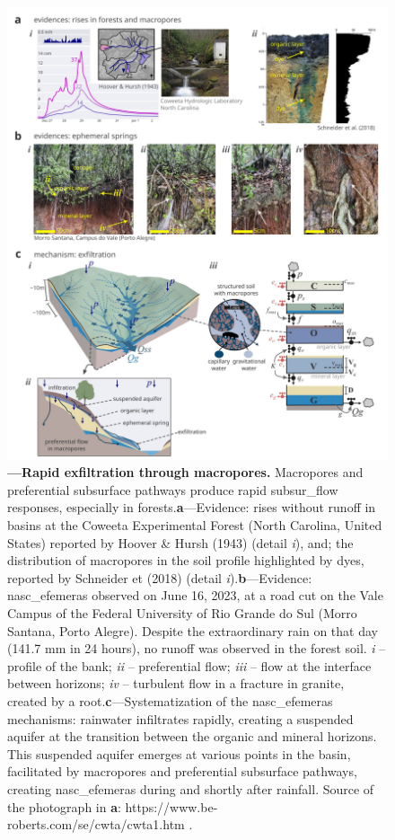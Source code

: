 \documentclass[./main_en.tex]{subfiles}
\begin{document}
\begin{figure}[t!] 
\centering				
\includegraphics[width=0.98\linewidth]{figs/fig_macropores_en.jpg}		
\caption[Rapid exfiltration through macropores]
{\textbf{---\;Rapid exfiltration through macropores.}
    Macropores and preferential subsurface pathways produce rapid \gls{subsur_flow} responses, especially in forests.\;\textbf{a}\;---\;Evidence: rises without runoff in basins at the Coweeta Experimental Forest (North Carolina, United States) reported by Hoover \& Hursh (1943) \cite{Hoover1943} (detail \textrm{\textit{i}}), and; the distribution of macropores in the soil profile highlighted by dyes, reported by Schneider et  (2018) \cite{Schneider2018} (detail \textrm{\textit{i}}).\;\textbf{b}\;---\;Evidence: \gls{nasc_efemeras} observed on June 16, 2023, at a road cut on the Vale Campus of the Federal University of Rio Grande do Sul (Morro Santana, Porto Alegre). Despite the extraordinary rain on that day (141.7 mm in 24 hours), no runoff was observed in the forest soil. \textrm{\textit{i}} -- profile of the bank; \textrm{\textit{ii}} -- preferential flow; \textrm{\textit{iii}} -- flow at the interface between horizons; \textrm{\textit{iv}} -- turbulent flow in a fracture in granite, created by a root.\;\textbf{c}\;---\;Systematization of the \gls{nasc_efemeras} mechanisms: rainwater infiltrates rapidly, creating a suspended aquifer at the transition between the organic and mineral horizons. This suspended aquifer emerges at various points in the basin, facilitated by macropores and preferential subsurface pathways, creating \gls{nasc_efemeras} during and shortly after rainfall. Source of the photograph in \textbf{a}: https://www.be-roberts.com/se/cwta/cwta1.htm .
}
\label{fig:hydro:macro} 		
\end{figure}
\end{document}
